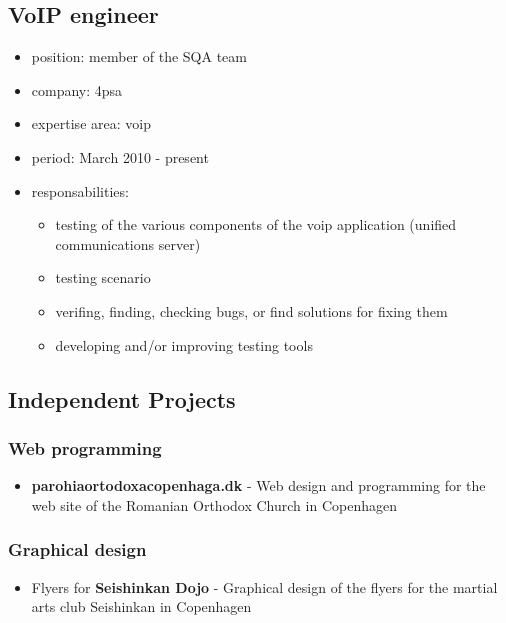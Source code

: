 \documentclass[a4paper,12pt,openany]{article}
\begin{document}
	\subsection{VoIP engineer}
		\begin{itemize}
			\item position: member of the SQA team
			\item company: 4psa
			\item expertise area: voip 	
			\item period: March 2010 - present
			\item responsabilities: 
				\begin{itemize}
					\item testing of the various components of the voip application (unified communications server) 
					\item testing scenario 
					\item verifing, finding, checking bugs, or find solutions for fixing them
					\item developing and/or improving testing tools
				\end{itemize}

		\end{itemize}

	\subsection{Independent Projects}
		\subsubsection{Web programming}
		\begin{itemize}
			\item \textbf{parohiaortodoxacopenhaga.dk} - Web design and programming for the web site of the Romanian Orthodox Church in Copenhagen 
		\end{itemize}

		\subsubsection{Graphical design}
		\begin{itemize}
			\item Flyers for \textbf{Seishinkan Dojo} - Graphical design of the flyers for the martial arts club Seishinkan in Copenhagen
		\end{itemize}
		
		
		
\end{document}
